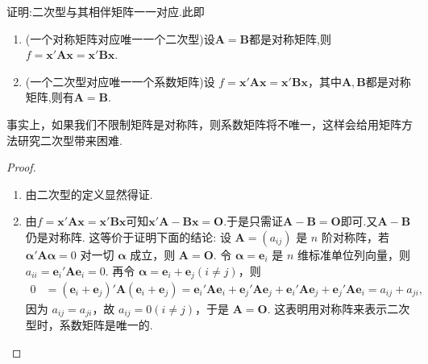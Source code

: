 \documentclass[../../main.tex]{subfiles}%
\begin{document}
\begin{theorem}\label{theorem:二次型与其相伴矩阵一一对应}
证明:二次型与其相伴矩阵一一对应.此即
\begin{enumerate}[(1)]
\item (一个对称矩阵对应唯一一个二次型)设$\boldsymbol{A}=\boldsymbol{B}$都是对称矩阵,则$f = \boldsymbol{x}'\boldsymbol{A}\boldsymbol{x}=\boldsymbol{x}'\boldsymbol{B}\boldsymbol{x}$.

\item (一个二次型对应唯一一个系数矩阵)设 $f = \boldsymbol{x}'\boldsymbol{A}\boldsymbol{x}=\boldsymbol{x}'\boldsymbol{B}\boldsymbol{x}$，其中$\boldsymbol{A},\boldsymbol{B}$都是对称矩阵,则有$\boldsymbol{A}=\boldsymbol{B}$. 
\end{enumerate}
\end{theorem}
\begin{remark}
事实上，如果我们不限制矩阵是对称阵，则系数矩阵将不唯一，这样会给用矩阵方法研究二次型带来困难.
\end{remark}
\begin{proof}
\begin{enumerate}[(1)]
\item 由二次型的定义显然得证.

\item 由$f = \boldsymbol{x}'\boldsymbol{A}\boldsymbol{x}=\boldsymbol{x}'\boldsymbol{B}\boldsymbol{x}$可知$\boldsymbol{x}'\boldsymbol{A-B}\boldsymbol{x}=\boldsymbol{O}$.于是只需证$\boldsymbol{A-B}=\boldsymbol{O}$即可.又$\boldsymbol{A-B}$仍是对称阵.
这等价于证明下面的结论: 设 $\boldsymbol{A}=(a_{ij})$ 是 $n$ 阶对称阵，若 $\boldsymbol{\alpha}'\boldsymbol{A}\boldsymbol{\alpha}=0$ 对一切 $\boldsymbol{\alpha}$ 成立，则 $\boldsymbol{A}=\boldsymbol{O}$. 令 $\boldsymbol{\alpha}=\boldsymbol{e}_i$ 是 $n$ 维标准单位列向量，则 $a_{ii}=\boldsymbol{e}_i'\boldsymbol{A}\boldsymbol{e}_i = 0$. 再令 $\boldsymbol{\alpha}=\boldsymbol{e}_i+\boldsymbol{e}_j (i\neq j)$，则
\begin{align*}
0&=(\boldsymbol{e}_i+\boldsymbol{e}_j)'\boldsymbol{A}(\boldsymbol{e}_i+\boldsymbol{e}_j)=\boldsymbol{e}_i'\boldsymbol{A}\boldsymbol{e}_i+\boldsymbol{e}_j'\boldsymbol{A}\boldsymbol{e}_j+\boldsymbol{e}_i'\boldsymbol{A}\boldsymbol{e}_j+\boldsymbol{e}_j'\boldsymbol{A}\boldsymbol{e}_i=a_{ij}+a_{ji},
\end{align*}
因为 $a_{ij}=a_{ji}$，故 $a_{ij}=0 (i\neq j)$，于是 $\boldsymbol{A}=\boldsymbol{O}$. 这表明用对称阵来表示二次型时，系数矩阵是唯一的. 
\end{enumerate}

\end{proof}
\end{document}
